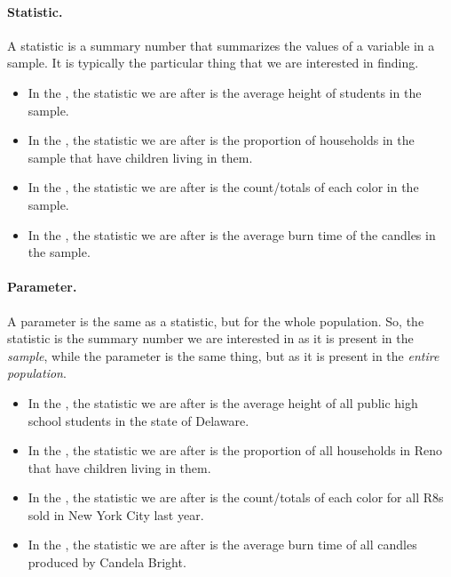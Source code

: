 \documentclass[../../../main.tex]{subfiles}
\begin{document}
\paragraph{Statistic.}

A statistic is a summary number that summarizes the values of a variable in a sample. It is typically the particular thing that we are interested in finding.

\begin{itemize}

  \item In the , the statistic we are after is the average height of students in the sample.
    
  \item In the , the statistic we are after is the proportion of households in the sample that have children living in them.

  \item In the , the statistic we are after is the count/totals of each color in the sample.
  
  \item In the , the statistic we are after is the average burn time of the candles in the sample.

\end{itemize}


\paragraph{Parameter.}

A parameter is the same as a statistic, but for the whole population. So, the statistic is the summary number we are interested in as it is present in the \emph{sample}, while the parameter is the same thing, but as it is present in the \emph{entire population}.

\begin{itemize}

  \item In the , the statistic we are after is the average height of all public high school students in the state of Delaware.
    
  \item In the , the statistic we are after is the proportion of all households in Reno that have children living in them.

  \item In the , the statistic we are after is the count/totals of each color for all R8s sold in New York City last year.
  
  \item In the , the statistic we are after is the average burn time of all candles produced by Candela Bright.

\end{itemize}
\end{document}
